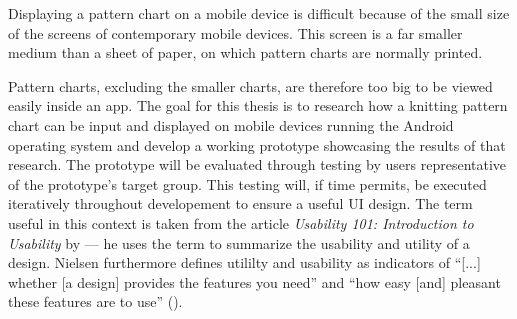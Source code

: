 Displaying a pattern chart on a mobile device is difficult because of the small size of the screens of contemporary mobile devices. This screen is a far smaller medium than a sheet of paper, on which pattern charts are normally printed. 

Pattern charts, excluding the smaller charts, are therefore too big to be viewed easily inside an app. The goal for this thesis is to research how a knitting pattern chart can be input and displayed on mobile devices running the Android operating system and develop a working prototype showcasing the results of that research. The prototype will be evaluated through testing by users representative of the prototype's target group. This testing will, if time permits, be executed iteratively throughout developement to ensure a useful \gls{UI} design. The term useful in this context is taken from the article \textit{Usability 101: Introduction to Usability} by \cite{nielsen2014} --- he uses the term to summarize the usability and utility of a design. Nielsen furthermore defines utililty and usability as indicators of ``[...] whether [a design] provides the features you need'' and ``how easy [and] pleasant these features are to use'' (\cite{nielsen2014}).